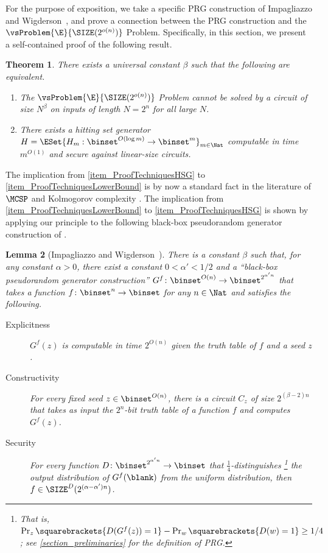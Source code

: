 \documentclass[11pt]{article}
\numberwithin{equation}{section}
\newtheorem{theorem}{Theorem}[section]
\newtheorem{lemma}[theorem]{Lemma}
\theoremstyle{definition}
\theoremstyle{plain}
\begin{document}
For the purpose of exposition, we take a specific PRG construction of Impagliazzo and Wigderson~\cite{ImpagliazzoW97_stoc_conf},
and prove a connection between the PRG construction and the $\vsProblem{\E}{\SIZE(2^{o(n)})}$ Problem.
Specifically, in this section, we present a self-contained proof of the following result.
\begin{theorem}
  \label{thm_ProofTechniques}
  There exists a universal constant $\beta$ such that the following are equivalent.
  \begin{enumerate}
    \item The $\vsProblem{\E}{\SIZE(2^{o(n)})}$ Problem cannot be solved by a circuit of size $N^{\beta}$ on inputs of length $N = 2^n$ for all large $N$.
          \label{item_ProofTechniquesLowerBound}
    \item There exists a hitting set generator $H = \ESet{ H_m : \binset^{O(\log m)} \to \binset^m }_{m \in \Nat}$ computable in time $m^{O(1)}$ and secure against linear-size circuits.
          \label{item_ProofTechniquesHSG}
  \end{enumerate}
\end{theorem}
The implication from \cref{item_ProofTechniquesHSG} to \cref{item_ProofTechniquesLowerBound}
is by now a standard fact in the literature of $\MCSP$ and Kolmogorov complexity \cite{RazborovR97_jcss_journals,AllenderBKMR06_siamcomp_journals}.
The implication from \cref{item_ProofTechniquesLowerBound} to \cref{item_ProofTechniquesHSG}
is shown by applying our principle to the following black-box pseudorandom generator construction of \cite{ImpagliazzoW97_stoc_conf}.
\begin{lemma}
  [Impagliazzo and Wigderson~\cite{ImpagliazzoW97_stoc_conf}]
  \label{lemma_IWBBConstruction}
  There is a constant $\beta$ such that,
  for any constant $\alpha > 0$,
  there exist
  a constant $0 < \alpha' < 1/2$ and
  a ``black-box pseudorandom generator construction''
  $G^f \colon \binset^{O(n)} \to \binset^{2^{\alpha' n}}$
  that takes a function $f \colon \binset^n \to \binset$ for any $n \in \Nat$
  and satisfies the following.
  \begin{description}
    \item[Explicitness]
          $G^f(z)$ is computable in time $2^{O(n)}$
          given the truth table of $f$ and a seed $z$.
    \item[Constructivity]
          For every fixed seed $z \in \binset^{O(n)}$,
          there is a circuit $C_z$ of size $2^{(\beta - 2) n}$ that
          takes as input the $2^n$-bit truth table of a function $f$ and
          computes $G^f(z)$.
    \item[Security]
          For every function $D \colon \binset^{2^{\alpha' n}} \to \binset$ that
          $\frac{1}{4}$-\emph{distinguishes}%
          \footnote{That is, $\Pr_z \squarebrackets{ D(G^f(z)) = 1} - \Pr_w \squarebrackets{D(w) = 1} \ge 1/4$; see \cref{section_preliminaries} for the definition of PRG.}
          the output distribution
          of $G^f(\blank)$ from the uniform distribution,
          then
          $f \in \SIZE^D(2^{(\alpha - \alpha') n})$.
  \end{description}
\end{lemma}
\end{document}
